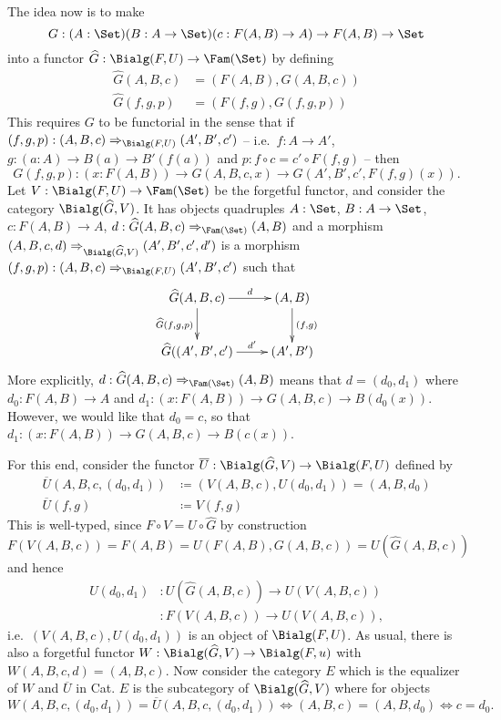 \documentclass{article}
\begin{document}
The idea now is to make
\[
G : (A : \Set)(B : A \to \Set)(c : F(A,B) \to A) \to F(A,B) \to \Set
\]
into a functor $\widehat{G} : \Bialg(F, U) \to \Fam(\Set)$ by defining
\begin{align*}
\widehat{G}(A, B, c) &= (F(A, B), G(A, B, c)) \\
\widehat{G}(f,g, p) &= (F(f,g), G(f,g, p))
\end{align*}
This requires $G$ to be functorial in the sense that if $(f, g, p) : (A, B, c) \Rightarrow_{\Bialg(F, U)} (A', B', c')$ -- i.e.\ $f : A \to A'$, $g : (a : A) \to B(a) \to B'(f(a))$ and $p : f \circ c = c' \circ F(f,g)$ -- then
\[
G(f,g,p) : (x : F(A, B)) \to G(A, B, c, x) \to G(A', B', c', F(f,g)(x)).
\]
Let $V : \Bialg(F, U) \to \Fam(\Set)$ be the forgetful functor, and
consider the category $\Bialg(\widehat{G}, V)$. It has objects
quadruples $A : \Set$, $B : A \to \Set$, $c : F(A, B) \to A$, $d :
\widehat{G}(A, B, c) \Rightarrow_{\Fam(\Set)} (A, B)$ and a
morphism $(A, B, c, d) \Rightarrow_{\Bialg(\widehat{G}, V)} (A', B',
c', d')$ is a morphism $(f, g, p) : (A, B, c) \Rightarrow_{\Bialg(F, U)} (A', B', c')$ such that
\[
\xymatrix{
\widehat{G}(A, B, c) \ar^-{d}[r] \ar_-{\widehat{G}(f,g, p)}[d] & (A, B) \ar^-{(f, g)}[d] \\
\widehat{G}((A',B', c') \ar^-{d'}[r] & (A',B') \\
}
\]
More explicitly, $d : \widehat{G}(A, B, c) \Rightarrow_{\Fam(\Set)}
(A, B)$ means that $d = (d_0, d_1)$ where $d_0 : F(A, B) \to A$ and
$d_1 : (x : F(A, B)) \to G(A, B, c) \to B(d_0(x))$. However, we would
like that $d_0 = c$, so that $d_1 : (x : F(A, B)) \to G(A, B, c) \to
B(c(x))$.

For this end, consider the functor $\overline{U} :
\Bialg(\widehat{G}, V) \to \Bialg(F, U)$ defined by
\begin{align*}
  \overline{U}(A, B, c, (d_0, d_1)) &\coloneqq (V(A, B, c), U(d_0, d_1)) = (A, B, d_0) \\
  \overline{U}(f, g) &\coloneqq V(f, g) %
\end{align*}
This is well-typed, since $F \circ V = U \circ \widehat{G}$ by construction
\[
F(V(A, B, c)) = F(A, B) = U(F(A, B), G(A, B, c)) = U(\widehat{G}(A, B, c))
\]
and hence
\begin{align*}
U(d_0, d_1) &: U(\widehat{G}(A, B, c)) \to U(V(A, B, c)) \\
            &: F(V(A, B, c)) \to U(V(A, B, c)),
\end{align*}
i.e.\ $(V(A, B, c), U(d_0, d_1))$ is an object of $\Bialg(F, U)$.  As
usual, there is also a forgetful functor $W : \Bialg(\widehat{G}, V)
\to \Bialg(F, u)$ with $W(A, B, c, d) = (A, B, c)$. Now consider the
category $E$ which is the equalizer of $W$ and $\overline{U}$ in
Cat. $E$ is the subcategory of $\Bialg(\widehat{G}, V)$ where for objects
\[
W(A, B, c, (d_0, d_1)) = \overline{U}(A, B, c, (d_0, d_1)) \Leftrightarrow
(A, B, c) = (A, B, d_0) \Leftrightarrow
c = d_0.
\]
\end{document}
